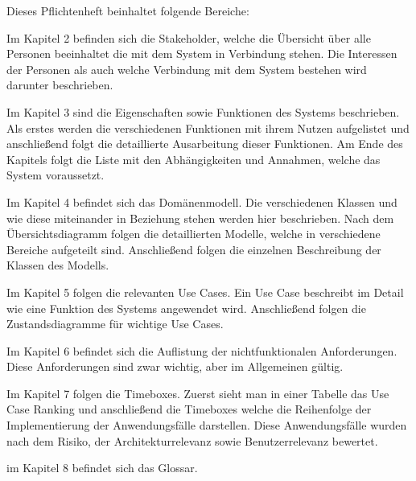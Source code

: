 \documentclass[../../Pflichtenheft.tex]{subfiles}
\begin{document}
	Dieses Pflichtenheft beinhaltet folgende Bereiche:
	
	Im Kapitel 2 befinden sich die Stakeholder, welche die Übersicht über
	alle Personen beeinhaltet die mit dem System in Verbindung stehen.
	Die Interessen der Personen als auch welche Verbindung mit dem System
	bestehen wird darunter beschrieben.
	
	Im Kapitel 3 sind die Eigenschaften sowie Funktionen des Systems beschrieben.
	Als erstes werden die verschiedenen Funktionen mit ihrem Nutzen aufgelistet und
	anschließend folgt die detaillierte Ausarbeitung dieser Funktionen.
	Am Ende des Kapitels folgt die Liste mit den Abhängigkeiten und Annahmen, welche
	das System voraussetzt.
	
	Im Kapitel 4 befindet sich das Domänenmodell. Die verschiedenen Klassen und wie
	diese miteinander in Beziehung stehen werden hier beschrieben. 
	Nach dem Übersichtsdiagramm folgen die detaillierten Modelle, welche in
	verschiedene Bereiche aufgeteilt sind.
	Anschließend folgen die einzelnen Beschreibung der Klassen des Modells.
	
	Im Kapitel 5 folgen die relevanten Use Cases. Ein Use Case beschreibt im Detail
	wie eine Funktion des Systems angewendet wird. Anschließend folgen die
	Zustandsdiagramme für wichtige Use Cases.
	
	Im Kapitel 6 befindet sich die Auflistung der nichtfunktionalen Anforderungen.
	Diese Anforderungen sind zwar wichtig, aber im Allgemeinen gültig.
	
	Im Kapitel 7 folgen die Timeboxes. Zuerst sieht man in einer Tabelle das Use Case
	Ranking und anschließend die Timeboxes welche die Reihenfolge der Implementierung
	der Anwendungsfälle darstellen. Diese Anwendungsfälle wurden nach dem Risiko, der
	Architekturrelevanz sowie Benutzerrelevanz bewertet.
	
	im Kapitel 8 befindet sich das Glossar.
\end{document}
